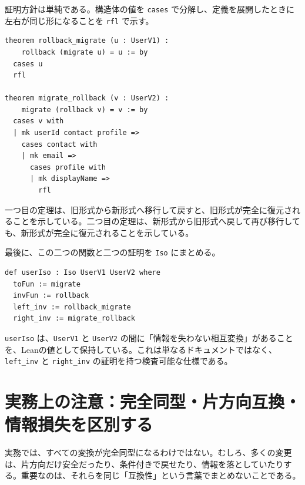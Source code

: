 証明方針は単純である。構造体の値を \texttt{cases} で分解し、定義を展開したときに左右が同じ形になることを \texttt{rfl} で示す。

\begin{listing}[htbp]
\begin{verbatim}
theorem rollback_migrate (u : UserV1) :
    rollback (migrate u) = u := by
  cases u
  rfl

theorem migrate_rollback (v : UserV2) :
    migrate (rollback v) = v := by
  cases v with
  | mk userId contact profile =>
    cases contact with
    | mk email =>
      cases profile with
      | mk displayName =>
        rfl
\end{verbatim}
\caption{両方向のround-trip証明}
\label{lst:ch06_user_roundtrip}
\end{listing}

一つ目の定理は、旧形式から新形式へ移行して戻すと、旧形式が完全に復元されることを示している。二つ目の定理は、新形式から旧形式へ戻して再び移行しても、新形式が完全に復元されることを示している。

最後に、この二つの関数と二つの証明を \texttt{Iso} にまとめる。

\begin{listing}[htbp]
\begin{verbatim}
def userIso : Iso UserV1 UserV2 where
  toFun := migrate
  invFun := rollback
  left_inv := rollback_migrate
  right_inv := migrate_rollback
\end{verbatim}
\caption{UserV1 と UserV2 の同型}
\label{lst:ch06_user_iso}
\end{listing}

\begin{leanbox}
\texttt{userIso} は、\texttt{UserV1} と \texttt{UserV2} の間に「情報を失わない相互変換」があることを、Leanの値として保持している。これは単なるドキュメントではなく、\texttt{left\_inv} と \texttt{right\_inv} の証明を持つ検査可能な仕様である。
\end{leanbox}

\section{実務上の注意：完全同型・片方向互換・情報損失を区別する}
\label{sec:ch06-practical-classification}

実務では、すべての変換が完全同型になるわけではない。むしろ、多くの変更は、片方向だけ安全だったり、条件付きで戻せたり、情報を落としていたりする。重要なのは、それらを同じ「互換性」という言葉でまとめないことである。

